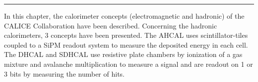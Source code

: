 \begin{center}
  \rule{0.5\textwidth}{.4pt}
\end{center}

In this chapter, the calorimeter concepts (electromagnetic and hadronic) of the CALICE Collaboration have been described. Concerning the hadronic calorimeters, 3 concepts have been presented. The AHCAL uses scintillator-tiles coupled to a SiPM readout system to measure the deposited energy in each cell. The DHCAL and SDHCAL use resistive plate chambers by ionization of a gas mixture and avalanche multiplication to measure a signal and are readout on 1 or 3 bits by measuring the number of hits.
